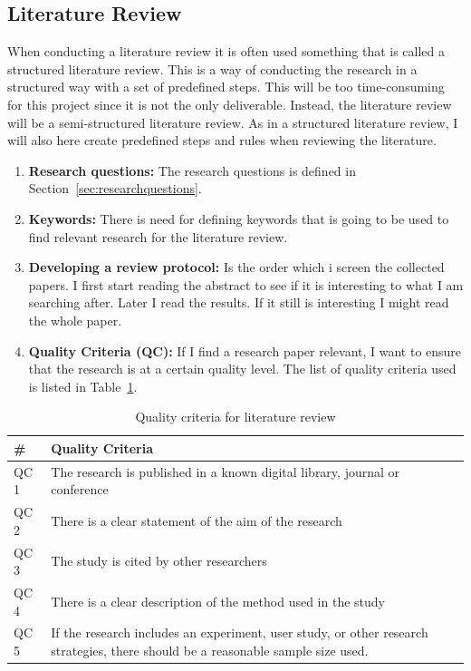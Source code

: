     \subsection{Literature Review}\label{sec:methodliteraturereview}
    When conducting a literature review it is often used something that is called a structured literature review. This is a way of conducting the research in a structured way with a set of predefined steps. This will be too time-consuming for this project since it is not the only deliverable. Instead, the literature review will be a semi-structured literature review. As in a structured literature review, I will also here create predefined steps and rules when reviewing the literature. 

      \begin{enumerate}
        \item {\bf Research questions:} The research questions is defined in Section~\ref{sec:researchquestions}.
        \item {\bf Keywords:} There is need for defining keywords that is going to be used to find relevant research for the literature review. 
        \item {\bf Developing a review protocol:} Is the order which i screen the collected papers. I first start reading the abstract to see if it is interesting to what I am searching after. Later I read the results. If it still is interesting I might read the whole paper. 
        \item {\bf Quality Criteria (QC):} If I find a research paper relevant, I want to ensure that the research is at a certain quality level. The list of quality criteria used is listed in Table~\ref{tab:QualityCriteria}. 
      \end{enumerate}

      \begin{table}[H]
        \centering
        \begin{tabular}{| l | p{10cm} |}
          \hline
          {\bf \#} & {\bf Quality Criteria} \\ \hline
          QC 1 & The research is published in a known digital library, journal or conference\\ \hline
          QC 2 & There is a clear statement of the aim of the research\\ \hline
          QC 3 & The study is cited by other researchers\\ \hline
          QC 4 & There is a clear description of the method used in the study\\ \hline
          QC 5 & If the research includes an experiment, user study, or other research strategies, there should be a reasonable sample size used. \\ \hline
        \end{tabular}
        \caption{Quality criteria for literature review}
        \label{tab:QualityCriteria}
      \end{table}
    
